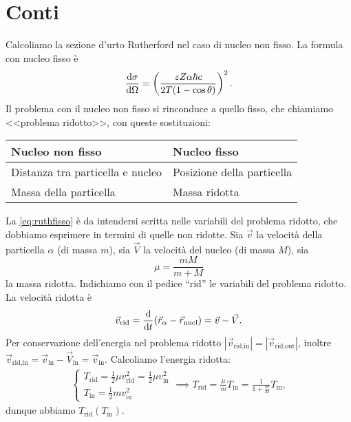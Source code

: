 \section{Conti}
\label{sec:conti}

Calcoliamo la sezione d'urto Rutherford nel caso di nucleo non fisso.
La formula con nucleo fisso è
\begin{equation}
	\label{eq:ruthfisso}
	\frac{\mathrm{d} \sigma}{\mathrm{d} \Omega} = \left( \frac {zZ\alpha\hbar c} {2T(1-\cos\theta)} \right)^2.
\end{equation}
Il problema con il nucleo non fisso si rinconduce a quello fisso,
che chiamiamo <<problema ridotto>>, con queste sostituzioni:
\begin{center}
	\begin{tabular}{ll}
		Nucleo non fisso                 & Nucleo fisso               \\
		\hline
		Distanza tra particella e nucleo & Posizione della particella \\
		Massa della particella           & Massa ridotta              
	\end{tabular}
\end{center}
La \eqref{eq:ruthfisso} è da intendersi scritta nelle variabili del problema ridotto,
che dobbiamo esprimere in termini di quelle non ridotte.
Sia $\vec v$ la velocità della particella $\alpha$ (di massa $m$),
sia $\vec V$ la velocità del nucleo (di massa $M$), sia
\begin{equation*}
	\mu = \frac{mM}{m + M}
\end{equation*}
la massa ridotta.
Indichiamo con il pedice ``rid'' le variabili del problema ridotto.
La velocità ridotta è
\begin{equation*}
	\vec v_\text{rid} = \frac{\mathrm{d} }{\mathrm{d} t}(\vec r_\alpha - \vec r_\text{nucl}) = \vec v - \vec V.
\end{equation*}
Per conservazione dell'energia nel problema ridotto
$|\vec v_\text{rid,in}| = |\vec v_\text{rid,out}|$,
inoltre
$\vec v_\text{rid,in}
= \vec v_\text{in} - \vec V_\text{in}
= \vec v_\text{in}$.
Calcoliamo l'energia ridotta:
\begin{align*}
	\begin{cases}
		T_\text{rid} = \frac12 \mu v_\text{rid}^2 = \frac12 \mu v_\text{in}^2 \\
		T_\text{in}  = \frac12 m v_\text{in}^2
	\end{cases} \implies
	T_\text{rid} = \frac\mu m T_\text{in} = \frac1{1+\frac mM} T_\text{in},
\end{align*}
dunque abbiamo $T_\text{rid}(T_\text{in})$.
